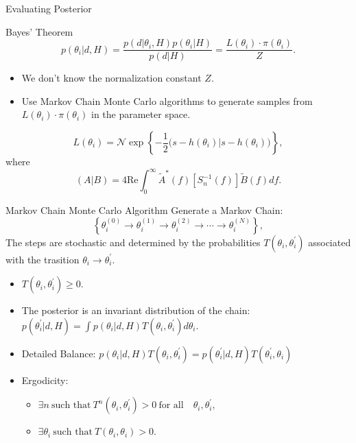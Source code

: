 \documentclass[xcolor=dvipsnames]{beamer}
\begin{document}
\begin{frame}[t]{Evaluating Posterior}
  \begin{block}{Bayes' Theorem}
    \begin{equation*}
      p(\theta_i | d, H) = \frac{p(d | \theta_i, H) p(\theta_i | H)}{p(d | H)} = \frac{L(\theta_i) \cdot \pi(\theta_i)}{Z}.
    \end{equation*}
  \end{block}
  \begin{itemize}
    \item We don't know the normalization constant $Z$.
    \item Use Markov Chain Monte Carlo algorithms to generate samples from $L(\theta_i) \cdot \pi(\theta_i)$ in the parameter space.
  \end{itemize}
  \begin{equation*}
    L(\theta_i) = \mathcal{N} \exp \left\{ -\frac{1}{2} \Big( s - h(\theta_i) | s - h(\theta_i) \Big) \right\},
  \end{equation*}
  where
  \begin{equation*}
    (A|B) = 4 \text{Re} \int_0^\infty \tilde{A}^\ast(f) [S_n^{-1}(f)] \tilde{B}(f) df.
  \end{equation*}
\end{frame}

\begin{frame}[t]{Markov Chain Monte Carlo Algorithm}
  Generate a Markov Chain:
  \begin{equation*}
    \left\{ \theta_i^{(0)} \rightarrow \theta_i^{(1)} \rightarrow \theta_i^{(2)} \rightarrow \cdots \rightarrow \theta_i^{(N)} \right\},
  \end{equation*}
  The steps are stochastic and determined by the probabilities $T(\theta_i, \theta_i^{\prime})$ associated with the trasition $\theta_i \rightarrow \theta_i^{\prime}$.
  \begin{itemize}
    \item $T(\theta_i, \theta_i^{\prime}) \ge 0.$
    \item The posterior is an invariant distribution of the chain: $p(\theta_i^{\prime} | d, H) = \int p(\theta_i | d, H) T(\theta_i, \theta_i^{\prime}) d\theta_i.$
    \item Detailed Balance: $p(\theta_i | d, H) T(\theta_i, \theta_i^{\prime}) = p(\theta_i^{\prime} | d, H) T(\theta_i^{\prime}, \theta_i)$
    \item Ergodicity:
    \begin{itemize}
      \item $\exists n ~ \text{such that} ~ T^n(\theta_i, \theta_i^{\prime}) > 0 ~ \text{for all} \quad \theta_i, \theta_i^{\prime},$
      \item $\exists \theta_i ~ \text{such that} ~ T(\theta_i, \theta_i) > 0.$
    \end{itemize}
  \end{itemize}
\end{frame}
\end{document}
